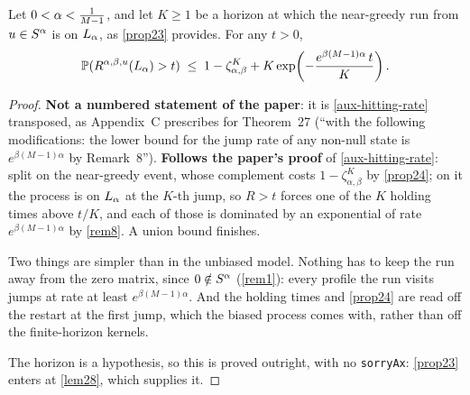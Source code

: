 \begin{lemma}
  \label{aux-biased-hitting-rate}
  \leanok
  Let $0 < \alpha < \tfrac{1}{M-1}$, and let $K \ge 1$ be a horizon at which the
  near-greedy run from $u \in S^\alpha$ is on $L_\alpha$, as
  \ref{prop23} provides.  For any $t > 0$,
  \[
    \mathbb{P}(R^{\alpha,\beta,u}(L_\alpha) > t)
      \;\le\; 1 - \zeta_{\alpha,\beta}^{K}
        + K \exp\!\left(-\frac{e^{\beta(M-1)\alpha}\, t}{K}\right).
  \]
\end{lemma}
\begin{proof}
  \leanok
  \textbf{Not a numbered statement of the paper}: it is \ref{aux-hitting-rate}
  transposed, as Appendix~C prescribes for Theorem~27 (``with the following
  modifications: the lower bound for the jump rate of any non-null state is
  $e^{\beta(M-1)\alpha}$ by Remark~8'').  \textbf{Follows the paper's proof} of
  \ref{aux-hitting-rate}: split on the near-greedy event, whose complement
  costs $1 - \zeta_{\alpha,\beta}^K$ by \ref{prop24}; on it the process is on
  $L_\alpha$ at the $K$-th jump, so $R > t$ forces one of the $K$
  holding times above $t/K$, and each of those is dominated by an exponential
  of rate $e^{\beta(M-1)\alpha}$ by \ref{rem8}.  A union bound finishes.

  Two things are simpler than in the unbiased model.  Nothing has to keep the
  run away from the zero matrix, since $0 \notin S^\alpha$ (\ref{rem1}): every
  profile the run visits jumps at rate at least $e^{\beta(M-1)\alpha}$.  And the
  holding times and \ref{prop24} are read off the restart at the first jump,
  which the biased process comes with, rather than off the finite-horizon
  kernels.

  The horizon is a hypothesis, so this is proved outright, with no
  \texttt{sorryAx}: \ref{prop23} enters at \ref{lem28}, which supplies it.
\end{proof}

